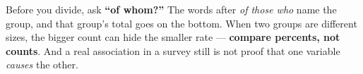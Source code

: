 \documentclass[12pt]{article}
\begin{document}
\vspace{0.14in}

\boxguard[8]
\begin{remindbox}
\small
Before you divide, ask \textbf{``of whom?''} The words after \emph{of those who} name the group,
and that group's total goes on the bottom. When two groups are different sizes, the bigger count
can hide the smaller rate --- \textbf{compare percents, not counts}. And a real association in a
survey still is not proof that one variable \emph{causes} the other.
\end{remindbox}
\end{document}
